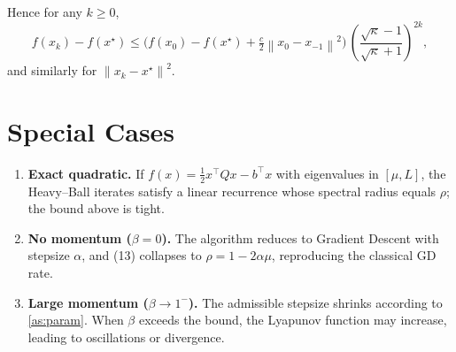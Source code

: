 \documentclass{article}
\newcommand{\norm}[1]{\left\|#1\right\|}
\begin{document}
Hence for any $k\ge 0$,
\[
f(x_k)-f(x^\star)\le \bigl(f(x_0)-f(x^\star)+\tfrac{c}{2}\norm{x_0-x_{-1}}^{2}\bigr)\,
\left(\frac{\sqrt{\kappa}-1}{\sqrt{\kappa}+1}\right)^{2k},
\]
and similarly for $\norm{x_k-x^\star}^{2}$.  

\section*{Special Cases}
\begin{enumerate}
\item \textbf{Exact quadratic.} If $f(x)=\tfrac{1}{2}x^{\top}Qx-b^{\top}x$ with eigenvalues in $[\mu,L]$, the Heavy–Ball iterates satisfy a linear recurrence whose spectral radius equals $\rho$; the bound above is tight.
\item \textbf{No momentum ($\beta=0$).} The algorithm reduces to Gradient Descent with stepsize $\alpha$, and (13) collapses to $\rho=1-2\alpha\mu$, reproducing the classical GD rate.
\item \textbf{Large momentum ($\beta\to1^{-}$).} The admissible stepsize shrinks according to \eqref{as:param}. When $\beta$ exceeds the bound, the Lyapunov function may increase, leading to oscillations or divergence.
\end{enumerate}
\end{document}
